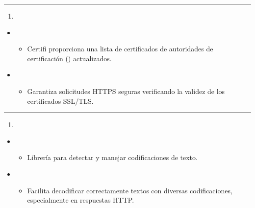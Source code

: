 \documentclass[a4paper,10pt,spanish]{sphinxmanual}
\begin{document}
\bigskip\hrule\bigskip

\begin{enumerate}
%
\setcounter{enumi}{2}
\item {} 
\sphinxAtStartPar
{}

\end{enumerate}
\begin{itemize}
\item {} 
\sphinxAtStartPar
{}
\begin{itemize}
\item {} 
\sphinxAtStartPar
Certifi proporciona una lista de certificados de autoridades de certificación () actualizados.

\end{itemize}

\item {} 
\sphinxAtStartPar
{}
\begin{itemize}
\item {} 
\sphinxAtStartPar
Garantiza solicitudes HTTPS seguras verificando la validez de los certificados SSL/TLS.

\end{itemize}

\end{itemize}


\bigskip\hrule\bigskip

\begin{enumerate}
%
\setcounter{enumi}{3}
\item {} 
\sphinxAtStartPar
{}

\end{enumerate}
\begin{itemize}
\item {} 
\sphinxAtStartPar
{}
\begin{itemize}
\item {} 
\sphinxAtStartPar
Librería para detectar y manejar codificaciones de texto.

\end{itemize}

\item {} 
\sphinxAtStartPar
{}
\begin{itemize}
\item {} 
\sphinxAtStartPar
Facilita decodificar correctamente textos con diversas codificaciones, especialmente en respuestas HTTP.

\end{itemize}

\end{itemize}
\end{document}
